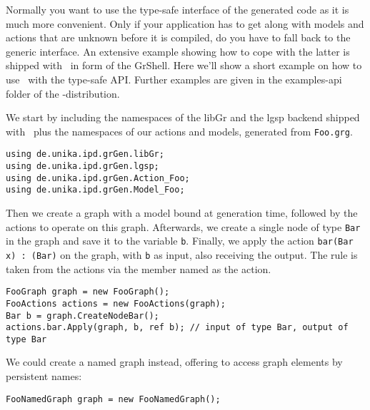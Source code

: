 \begin{example}\label{ex:api1}
Normally you want to use the type-safe interface of the generated code as it is much more convenient.
Only if your application has to get along with models and actions that are unknown before it is compiled, do you have to fall back to the generic interface.
An extensive example showing how to cope with the latter is shipped with \GrG\ in form of the GrShell.
Here we'll show a short example on how to use \GrG\ with the type-safe API.
Further examples are given in the examples-api folder of the \GrG-distribution.

We start by including the namespaces of the libGr and the lgsp backend shipped with \GrG\,
plus the namespaces of our actions and models, generated from \texttt{Foo.grg}.
\begin{verbatim}
using de.unika.ipd.grGen.libGr;
using de.unika.ipd.grGen.lgsp;
using de.unika.ipd.grGen.Action_Foo;
using de.unika.ipd.grGen.Model_Foo;
\end{verbatim}

Then we create a graph with a model bound at generation time, followed by the actions to operate on this graph.
Afterwards, we create a single node of type \texttt{Bar} in the graph and save it to the variable \texttt{b}.
Finally, we apply the action \texttt{bar(Bar x) : (Bar)} on the graph, with \texttt{b} as input, also receiving the output.
The rule is taken from the actions via the member named as the action.
\begin{verbatim}
FooGraph graph = new FooGraph();
FooActions actions = new FooActions(graph);
Bar b = graph.CreateNodeBar();
actions.bar.Apply(graph, b, ref b); // input of type Bar, output of type Bar
\end{verbatim}

We could create a named graph instead, offering to access graph elements by persistent names:
\begin{verbatim}
FooNamedGraph graph = new FooNamedGraph();
\end{verbatim}
\end{example}

